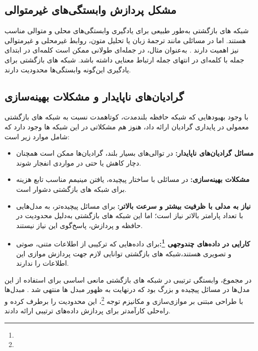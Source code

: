 \subsection{مشکل پردازش وابستگی‌های غیرمتوالی}
شبکه های بازگشتی به‌طور طبیعی برای یادگیری وابستگی‌های محلی و متوالی مناسب هستند. اما در مسائلی مانند ترجمهٔ زبان یا تحلیل متون، روابط غیرمحلی و غیرمتوالی نیز اهمیت دارند
\cite{bahdanau2014neural}.
به‌عنوان مثال، در جمله‌ای طولانی ممکن است کلمه‌ای در ابتدای جمله با کلمه‌ای در انتهای جمله ارتباط معنایی داشته باشد. شبکه های بازگشتی برای یادگیری این‌گونه وابستگی‌ها محدودیت دارند.

\subsection{گرادیان‌های ناپایدار و مشکلات بهینه‌سازی}
با وجود بهبودهایی که شبکه حافظه بلندمدت، کوتاهمدت نسبت به شبکه های بازگشتی معمولی در پایداری گرادیان ارائه داد، هنوز هم مشکلاتی در این شبکه ها وجود دارد که شامل موارد زیر است:
\begin{itemize}
	\item \textbf{مسائل گرادیان‌های ناپایدار:}  
	در توالی‌های بسیار بلند، گرادیان‌ها ممکن است همچنان دچار کاهش یا حتی در مواردی انفجار شوند.
	
	\item \textbf{مشکلات بهینه‌سازی:}  
	در مسائلی با ساختار پیچیده، یافتن مینیمم مناسب تابع هزینه برای شبکه های بازگشتی دشوار است.
\end{itemize}


\begin{itemize}
	\item \textbf{نیاز به مدلی با ظرفیت بیشتر و سرعت بالاتر:}  
	برای مسائل پیچیده‌تر، به مدل‌هایی با تعداد پارامتر بالاتر نیاز است؛ اما این شبکه های بازگشتی به‌دلیل محدودیت در حافظه و پردازش، پاسخ‌گوی این نیاز نیستند.
	
\item \textbf{کارایی در داده‌های چندوجهی \footnote{}:}برای داده‌هایی که ترکیبی از اطلاعات متنی، صوتی و تصویری هستند،شبکه های بازگشتی توانایی لازم جهت پردازش موازی این اطلاعات را ندارند.
\end{itemize}

در مجموع، وابستگی ترتیبی در شبکه های بازگشتی مانعی اساسی برای استفاده از این مدل‌ها در مسائل پیچیده و بزرگ بود که درنهایت به ظهور مبدل ها منتهی شد
\cite{vaswani2017attention}.
مبدل‌ها با طراحی مبتنی بر موازی‌سازی و مکانیزم توجه \footnote{}، این محدودیت را برطرف کرده و راه‌حلی کارآمدتر برای پردازش داده‌های ترتیبی ارائه دادند.




